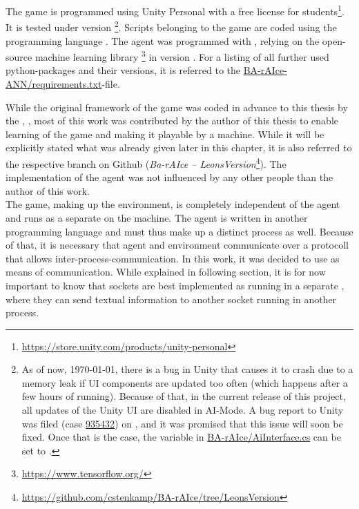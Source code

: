The game is programmed using Unity Personal with a free license for students\footnote{\url{https://store.unity.com/products/unity-personal}}. It is tested under version \footnote{As of now, \today, there is a bug in Unity that causes it to crash due to a memory leak if UI components are updated too often (which happens after a few hours of running). Because of that, in the current release of this project, all updates of the Unity UI are disabled in AI-Mode. A bug report to Unity was filed (case \href{https://fogbugz.unity3d.com/default.asp?935432_h1bir10rkmbc658k}{935432}) on , and it was promised that this issue will soon be fixed. Once that is the case, the variable  in \href{https://github.com/cstenkamp/BA-rAIce/blob/ef2dc018f36cd9ad65df90e65d8ab840c822567e/Assets/Scripts/AiInterface.cs\#L12-L13}{BA-rAIce/AiInterface.cs} can be set to .}.
Scripts belonging to the game are coded using the programming language . The agent was programmed with , relying on the open-source machine learning library \cite{abadi_tensorflow:_2015}\footnote{\url{https://www.tensorflow.org/}} in version . For a listing of all further used python-packages and their versions, it is referred to the \href{https://github.com/cstenkamp/BA-rAIce-ANN/blob/master/requirements.txt}{BA-rAIce-ANN/requirements.txt}-file. 

While the original framework of the game was coded in advance to this thesis by the \leonbase, , most of this work was contributed by the author of this thesis to enable learning of the game and making it playable by a machine. While it will be explicitly stated what was already given later in this chapter, it is also referred to the respective branch on Github (\textit{Ba-rAIce -- LeonsVersion}\footnote{\url{https://github.com/cstenkamp/BA-rAIce/tree/LeonsVersion}}). The implementation of the agent was not influenced by any other people than the author of this work.\\

\noindent The game, making up the environment, is completely independent of the agent and runs as a separate  on the machine. The agent is written in another programming language and must thus make up a distinct process as well. Because of that, it is necessary that agent and environment communicate over a protocoll that allows inter-process-communication. In this work, it was decided to use  as means of communication. While explained in following section, it is for now important to know that sockets are best implemented as running in a separate , where they can send textual information to another socket running in another process.

